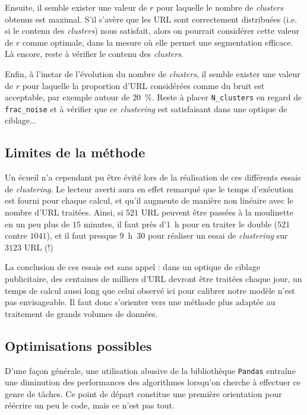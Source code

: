 \documentclass[11pt, a4paper]{article}
\begin{document}
Ensuite, il semble exister une valeur de $r$ pour laquelle le nombre de \textit{clusters} obtenus est maximal. S'il s'avère que les URL sont correctement distribuées (i.e. si le contenu des \textit{clusters}) nous satisfait, alors on pourrait considérer cette valeur de $r$ comme optimale, dans la mesure où elle permet une segmentation efficace. Là encore, reste à vérifier le contenu des \textit{clusters}.

Enfin, à l'instar de l'évolution du nombre de \textit{clusters}, il semble exister une valeur de $r$ pour laquelle la proportion d'URL considérées comme du bruit est acceptable, par exemple autour de $20$~\%. Reste à placer \texttt{N\_clusters} en regard de \texttt{frac\_noise} et à vérifier que ce \textit{clustering} est satisfaisant dans une optique de ciblage...

\subsection{Limites de la méthode}

Un écueil n'a cependant pu être évité lors de la réalisation de ces différents essais de \textit{clustering}. Le lecteur averti aura en effet remarqué que le temps d'exécution est fourni pour chaque calcul, et qu'il augmente de manière non linéaire avec le nombre d'URL traitées. Ainsi, si $521$ URL peuvent être passées à la moulinette en un peu plus de $15$ minutes, il faut près d'$1$~h pour en traiter le double ($521$ contre $1041$), et il faut presque $9$~h~$30$ pour réaliser un essai de \textit{clustering} sur $3123$ URL (!) 

La conclusion de ces essais est sans appel : dans un optique de ciblage publicitaire, des centaines de milliers d'URL devront être traitées chaque jour, un temps de calcul aussi long que celui observé ici pour calibrer notre modèle n'est pas envisageable. Il faut donc s'orienter vers une méthode plus adaptée au traitement de grands volumes de données.

\subsection{Optimisations possibles}

D'une façon générale, une utilisation abusive de la bibliothèque \texttt{Pandas} entraîne une diminution des performances des algorithmes lorsqu'on cherche à effectuer ce genre de tâches. Ce point de départ constitue une première orientation pour réécrire un peu le code, mais ce n'est pas tout.
\end{document}
